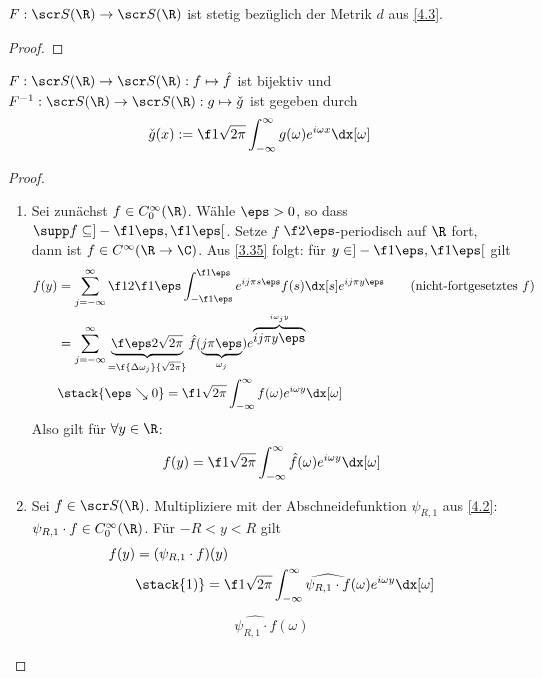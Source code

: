 \begin{nt} \label{4.9}
	$F : \scr S(\R) \to \scr S(\R)$ ist stetig bezüglich der Metrik $d$ aus \ref{4.3}.
	\begin{proof}
	\end{proof}
\end{nt}

\begin{st} \label{4.10}
	$F: \scr S(\R) \to \scr S(\R): f \mapsto \hat f$ ist bijektiv und $F^{-1}: \scr S(\R) \to \scr S(\R) : g \mapsto \check g$ ist gegeben durch
	\[
		\check g(x) := \f 1{\sqrt{2\pi}} \int_{-\infty}^\infty g(\omega) e^{i \omega x} \dx[\omega]
	\]
	\begin{proof}
		\begin{enumerate}[1)]
			\item
				Sei zunächst $f \in C_0^\infty(\R)$.
				Wähle $\eps > 0$, so dass $\supp f \subset ]-\f 1\eps, \f 1\eps[$.
				Setze $f$ $\f 2\eps$-periodisch auf $\R$ fort, dann ist $f \in C^\infty (\R \to \C)$.
				Aus \ref{3.35} folgt: für $y \in ]-\f 1\eps, \f 1\eps[$ gilt
				\begin{align*}
					f(y)
					&= \sum_{j=-\infty}^\infty \f 1{2 \f 1\eps} \int_{-\f 1\eps}^{\f 1\eps} e^{ij\pi s \eps} f(s) \dx[s] e^{ij\pi y \eps} \qquad \text{(nicht-fortgesetztes $f$)}\\
					&= \sum_{j=-\infty}^\infty \underbrace{\f \eps 2 \sqrt{2\pi}}_{= \f {\Delta \omega_j}{\sqrt{2\pi}}} \hat f(\underbrace{j\pi \eps}_{\omega_j}) e^{\overbrace{ij\pi y \eps}^{i\omega_j y}} \\
					&\stack{\eps \searrow 0}= \f 1{\sqrt{2\pi}} \int_{-\infty}^\infty f(\omega) e^{i\omega y} \dx[\omega]
				\end{align*}
				Also gilt für $\forall y \in \R$:
				\[
					f(y) = \f 1{\sqrt{2\pi}} \int_{-\infty}^\infty \hat f(\omega) e^{i \omega y} \dx[\omega]
				\]
			\item
				Sei $f \in \scr S(\R)$.
				Multipliziere mit der Abschneidefunktion $\psi_{R,1}$ aus \ref{4.2}: $\psi_{R,1}\cdot f \in C_0^\infty(\R)$.
				Für $-R < y < R$ gilt
				\begin{align*}
					f(y)
					&= (\psi_{R,1}\cdot f)(y) \\
					&\stack{1)}= \f 1{\sqrt{2\pi}} \int_{-\infty}^\infty \widehat{\psi_{R,1} \cdot f}(\omega) e^{i\omega y} \dx[\omega]
				\end{align*}
				\begin{align*}
					\widehat{\psi_{R,1} \cdot f}(\omega)

\end{align*}
\end{enumerate}
\end{proof}
\end{st}
